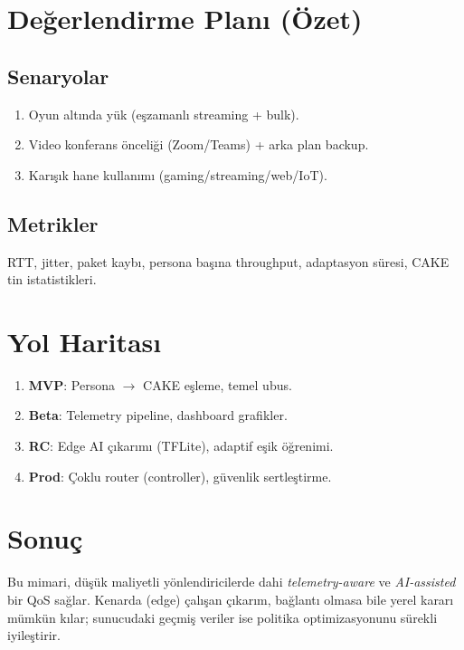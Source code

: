 \documentclass[11pt,a4paper]{article}
\begin{document}
\section{Değerlendirme Planı (Özet)}
\subsection{Senaryolar}
\begin{enumerate}
  \item Oyun altında yük (eşzamanlı streaming + bulk).
  \item Video konferans önceliği (Zoom/Teams) + arka plan backup.
  \item Karışık hane kullanımı (gaming/streaming/web/IoT).
\end{enumerate}

\subsection{Metrikler}
RTT, jitter, paket kaybı, persona başına throughput, adaptasyon süresi, CAKE tin istatistikleri.

\section{Yol Haritası}
\begin{enumerate}
  \item \textbf{MVP}: Persona $\rightarrow$ CAKE eşleme, temel ubus.
  \item \textbf{Beta}: Telemetry pipeline, dashboard grafikler.
  \item \textbf{RC}: Edge AI çıkarımı (TFLite), adaptif eşik öğrenimi.
  \item \textbf{Prod}: Çoklu router (controller), güvenlik sertleştirme.
\end{enumerate}

\section{Sonuç}
Bu mimari, düşük maliyetli yönlendiricilerde dahi \emph{telemetry-aware} ve \emph{AI-assisted}
bir QoS sağlar. Kenarda (edge) çalışan çıkarım, bağlantı olmasa bile yerel kararı mümkün kılar;
sunucudaki geçmiş veriler ise politika optimizasyonunu sürekli iyileştirir.
\end{document}
